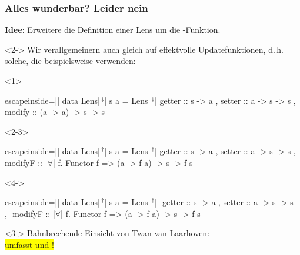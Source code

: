 \documentclass{beamer}
\newcommand{\kkreuz}{$\,^\ddag$} %
\newcommand{\fa}{$\forall$}
\begin{document}
\begin{frame}[fragile,t]
  \frametitle{
    Alles wunderbar? Leider nein
    \hfill
    {
      \small \color{greenncs}
    }
  }
  \textbf{Idee}: Erweitere die Definition einer Lens um die -Funktion. \\
  \begin{visibleenv}<2->
    Wir verallgemeinern auch gleich  auf effektvolle Updatefunktionen, d.\,h. solche, die beispielsweise  verwenden:
  \end{visibleenv}
  \begin{onlyenv}<1>
\begin{haskellcode*}{escapeinside=||}
data Lens|\kkreuz| s a = Lens|\kkreuz|
  { getter  :: s -> a
  , setter  :: a -> s -> s
  , modify  ::                   (a ->   a) -> s ->   s
  }
\end{haskellcode*}
  \end{onlyenv}
  \begin{onlyenv}<2-3>
\begin{haskellcode*}{escapeinside=||}
data Lens|\kkreuz| s a = Lens|\kkreuz|
  { getter  :: s -> a
  , setter  :: a -> s -> s
  , modifyF :: |\fa| f. Functor f => (a -> f a) -> s -> f s
  }
\end{haskellcode*}
  \end{onlyenv}
  \begin{onlyenv}<4->
\begin{haskellcode*}{escapeinside=||}
data Lens|\kkreuz| s a = Lens|\kkreuz|
  { {-getter  :: s -> a
  , setter  :: a -> s -> s
  ,-} modifyF :: |\fa| f. Functor f => (a -> f a) -> s -> f s
  }
\end{haskellcode*}
  \end{onlyenv}

  \vspace{2em}

  \begin{onlyenv}<3->
    \Large Bahnbrechende Einsicht von Twan van Laarhoven: \\

    \colorbox{yellow}{
      \huge {} umfasst  und !
    }
  \end{onlyenv}
\end{frame}
\end{document}
